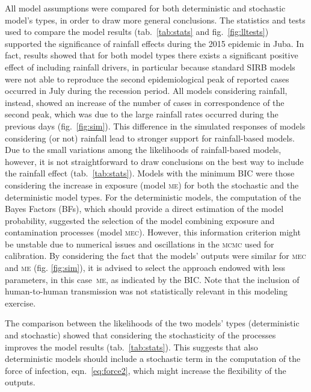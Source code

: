 All model assumptions were compared for both deterministic and stochastic model's types, in order to draw more general conclusions. The statistics and tests used to compare the model results  (tab.~\ref{tab:stats} and fig.~\ref{fig:lltests}) supported the significance of rainfall effects during the 2015 epidemic in Juba. In fact, results showed that for both model types there exists a significant positive effect of including rainfall drivers, in particular because standard SIRB models were not able to reproduce the second epidemiological peak of reported cases occurred in July during the recession period. All models considering rainfall, instead, showed an increase of the number of cases in correspondence of the second peak, which was due to the large rainfall rates occurred during the previous days (fig.~\ref{fig:sim}). 
This difference in the simulated responses of models considering (or not) rainfall lead to stronger support for rainfall-based models. Due to the small variations among the likelihoods of rainfall-based models, however, it is not straightforward to draw conclusions on the best way to include the rainfall effect (tab.~\ref{tab:stats}).
Models with the minimum BIC were those considering the increase in exposure (model \textsc{me}) for both the stochastic and the deterministic model types. For the deterministic models, the computation of the Bayes Factors (BFs), which should provide a direct estimation of the model probability, suggested the selection of the model combining exposure and contamination processes (model \textsc{mec}). However, this information criterion might be unstable due to numerical issues and oscillations in the \textsc{mcmc} used for calibration\cite{Raftery:EstimatingIntegratedLikelihood:2007}. By considering the fact that the models' outputs were similar for \textsc{mec} and \textsc{me} (fig. \ref{fig:sim}), it is advised to select the approach endowed with less parameters, in this case~\textsc{me}, as indicated by the BIC. Note that the inclusion of human-to-human transmission was not statistically relevant in this modeling exercise.
\marginnote{}

The comparison between the likelihoods of the two models' types (deterministic and stochastic) showed that considering the stochasticity of the processes improves the model results (tab.~\ref{tab:stats}). This suggests that also deterministic models should include a stochastic term in the computation of the force of infection, eqn.~\eqref{eq:force2}, which might increase the flexibility of the outputs.

